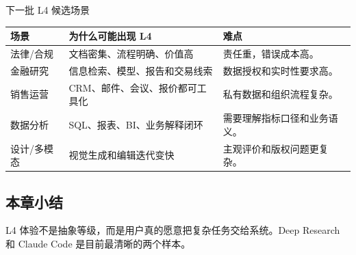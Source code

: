 \begin{knowledgebox}{下一批 L4 候选场景}
\begin{tabularx}{\textwidth}{p{}p{}X}
\toprule
场景 & 为什么可能出现 L4 & 难点 \\
\midrule
法律/合规 & 文档密集、流程明确、价值高 & 责任重，错误成本高。 \\
金融研究 & 信息检索、模型、报告和交易线索 & 数据授权和实时性要求高。 \\
销售运营 & CRM、邮件、会议、报价都可工具化 & 私有数据和组织流程复杂。 \\
数据分析 & SQL、报表、BI、业务解释闭环 & 需要理解指标口径和业务语义。 \\
设计/多模态 & 视觉生成和编辑迭代变快 & 主观评价和版权问题更复杂。 \\
\bottomrule
\end{tabularx}
\end{knowledgebox}

\subsection{本章小结}

L4 体验不是抽象等级，而是用户真的愿意把复杂任务交给系统。Deep Research 和 Claude Code 是目前最清晰的两个样本。

